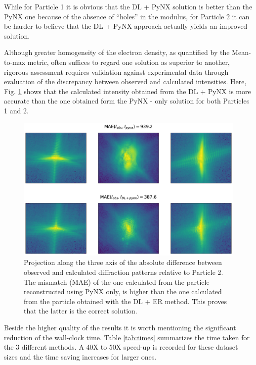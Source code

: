 While for Particle 1 it is obvious that the DL + PyNX solution is better than the PyNX one because of the absence of ``holes''
in the modulus, for Particle 2 it can be harder to believe that the DL + PyNX approach actually yields an improved solution. 

Although greater homogeneity of the electron density, as quantified by the Mean-to-max metric, often suffices to 
regard one solution as superior to another, rigorous assessment requires validation against experimental data 
through evaluation of the discrepancy between observed and calculated intensities.
Here, Fig. \ref{fig:dlpynx_proj2} shows that the calculated intensity obtained from the DL + PyNX 
is more accurate than the one obtained form the PyNX - only solution for both Particles 1 and 2. 

\begin{figure}[H]
    \centering
    \includegraphics[width=\textwidth]{figures/Phasing/proj_particle2.pdf}
    \caption{Projection along the three axis of the absolute difference between observed and calculated diffraction patterns 
    relative to Particle 2. 
    The mismatch (MAE) of the one calculated from the particle reconstructed using PyNX only, is higher than the one calculated 
    from the particle obtained with the DL + ER method. This proves that the latter is the correct solution. }
    \label{fig:dlpynx_proj2}
\end{figure}

Beside the higher quality of the results it is worth mentioning the significant reduction of the wall-clock time. 
Table \ref{tab:times} summarizes the time taken for the 3 different methods. A 40X to 50X speed-up is recorded for 
these dataset sizes and the time saving increases for larger ones.

